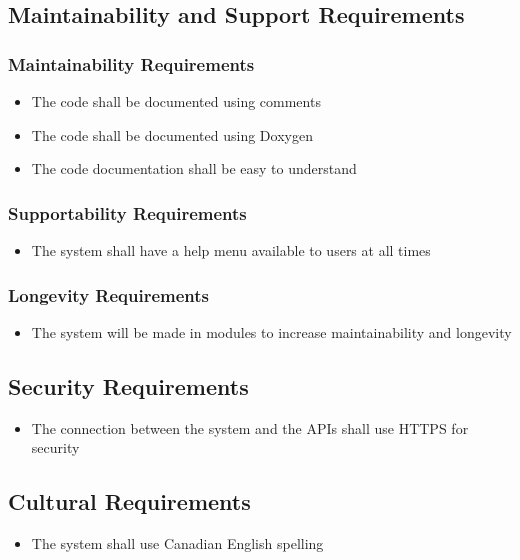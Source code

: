 \documentclass[12pt, titlepage]{article}
\begin{document}
\subsection{Maintainability and Support Requirements}
\subsubsection{Maintainability Requirements}
\begin{itemize}
    \item The code shall be documented using comments
    \item The code shall be documented using Doxygen
    \item The code documentation shall be easy to understand
\end{itemize}
\subsubsection{Supportability Requirements}
\begin{itemize}
    \item The system shall have a help menu available to users at all times
\end{itemize}
\subsubsection{Longevity Requirements}
\begin{itemize}
    \item The system will be made in modules to increase maintainability and longevity
\end{itemize}

\subsection{Security Requirements}
\begin{itemize}
    \item The connection between the system and the APIs shall use HTTPS for security
\end{itemize}

\subsection{Cultural Requirements}
\begin{itemize}
    \item The system shall use Canadian English spelling
\end{itemize}
\end{document}
